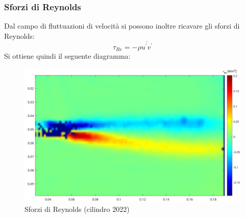 \subsubsection{Sforzi di Reynolds}
Dal campo di fluttuazioni di velocità si possono inoltre ricavare gli sforzi di Reynolds:
\begin{equation*}
    \tau_{Re} = -\rho \overline{u^\prime v^\prime}
\end{equation*}
Si ottiene quindi il seguente diagramma:
\begin{figure}[H]
    \centering
    \includegraphics[width=\textwidth]{images/11/tauRe.png}
    \caption{Sforzi di Reynolds (cilindro 2022)}
\end{figure}